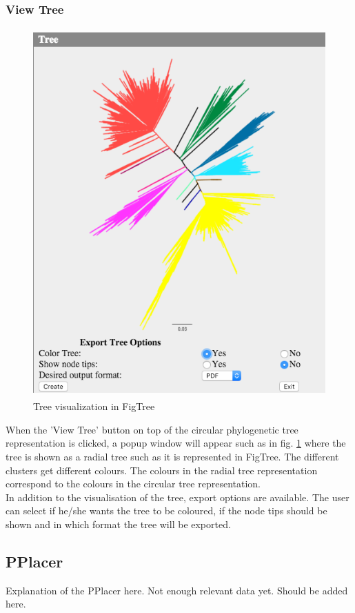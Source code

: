 \documentclass[a4paper, 11pt]{article} %
\begin{document}
\subsubsection{View Tree}
\begin{figure}[H]
\centering
\includegraphics[width=400pt, height=400pt, keepaspectratio=true]{images/view_tree.PNG}
\caption{Tree visualization in FigTree}
\label{fig:view_tree}
\end{figure}
When the 'View Tree' button on top of the circular phylogenetic tree representation is clicked, a popup window will appear such as in fig. \ref{fig:view_tree} where the tree is shown as a radial tree such as it is represented in FigTree. The different clusters get different colours. The colours in the radial tree representation correspond to the colours in the circular tree representation.
\\
In addition to the visualisation of the tree, export options are available. The user can select if he/she wants the tree to be coloured, if the node tips should be shown and in which format the tree will be exported. 

\subsection{PPlacer}
Explanation of the PPlacer here. Not enough relevant data yet. Should be added here.
\end{document}
